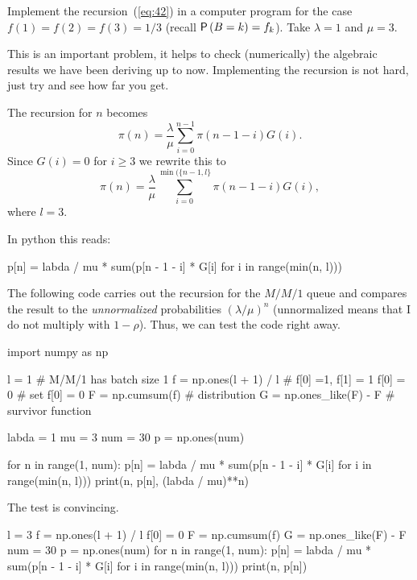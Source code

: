\begin{exercise}
  Implement the recursion~(\ref{eq:42}) in a computer program for the
  case $f(1)=f(2)=f(3)=1/3$ (recall $\P{B=k} =f_k$). Take $\lambda =1$
  and $\mu = 3$.  
  \begin{hint}
This is an important problem, it helps to check (numerically)
    the algebraic results we have been deriving up to
    now. Implementing the recursion is not hard, just try and see how
    far you get.
  \end{hint}
  \begin{solution}
The recursion for $n$ becomes 
\begin{equation*}
\pi(n) = \frac \lambda \mu \sum_{i=0}^{n-1} \pi(n-1-i)G(i).
\end{equation*}
Since $G(i) =0$ for $i\geq 3$ we rewrite this to 
\begin{equation*}
  \pi(n) = \frac\lambda \mu \sum_{i=0}^{\min(\{n-1,l\}} \pi(n-1-i)G(i),
\end{equation*}
where $l=3$. 

In python this reads:

\begin{pyverbatim}
p[n] = labda / mu * sum(p[n - 1 - i] * G[i] for i in range(min(n, l)))
\end{pyverbatim}

The following code carries out the recursion for the $M/M/1$ queue and compares the result to the \emph{unnormalized} probabilities $(\lambda/\mu)^n$ (unnormalized means that I do  not multiply with $1-\rho$). Thus, we can test the code right away. 

\begin{pyconsole}
import numpy as np

l = 1 # M/M/1 has batch size 1
f = np.ones(l + 1) / l # f[0] =1, f[1] = 1 
f[0] = 0 # set f[0] = 0
F = np.cumsum(f) # distribution 
G = np.ones_like(F) - F # survivor function

labda = 1
mu = 3
num = 30
p = np.ones(num)

for n in range(1, num):
    p[n] = labda / mu * sum(p[n - 1 - i] * G[i] for i in range(min(n, l)))
    print(n, p[n], (labda / mu)**n)

\end{pyconsole}
The test is convincing.

\begin{pyconsole}
l = 3
f = np.ones(l + 1) / l
f[0] = 0
F = np.cumsum(f)
G = np.ones_like(F) - F
num = 30
p = np.ones(num)
for n in range(1, num):
    p[n] = labda / mu * sum(p[n - 1 - i] * G[i] for i in range(min(n, l)))
    print(n, p[n])


\end{pyconsole}
\end{solution}
\end{exercise}
